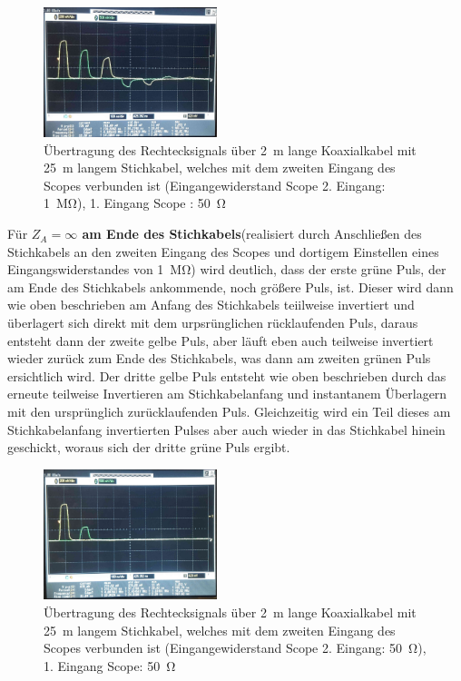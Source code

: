 \documentclass[a4paper,twoside,final]{article}
\begin{document}
\begin{figure}[htp]
    \centering
        \includegraphics[width=0.45\textwidth]{Bilder/Bild7.jpg}
    \caption{Übertragung des Rechtecksignals über \SI{2}{\meter} lange Koaxialkabel mit \SI{25}{\meter} langem Stichkabel, welches mit dem zweiten Eingang des Scopes verbunden ist (Eingangewiderstand Scope 2. Eingang: \SI{1}{\mega\ohm}), 1. Eingang Scope : \SI{50}{\ohm}}
\end{figure}

Für \textbf{$Z_A = \infty$ am Ende des Stichkabels}(realisiert durch Anschließen des Stichkabels an den zweiten Eingang des Scopes und dortigem Einstellen eines Eingangswiderstandes von \SI{1}{\mega\ohm}) wird deutlich, dass der erste grüne Puls, der am Ende des Stichkabels ankommende, noch größere Puls, ist. Dieser wird dann wie oben beschrieben am Anfang des Stichkabels teiilweise invertiert und überlagert sich direkt mit dem urpsrünglichen rücklaufenden Puls, daraus entsteht dann der zweite gelbe Puls, aber läuft eben auch teilweise invertiert wieder zurück zum Ende des Stichkabels, was dann am zweiten grünen Puls ersichtlich wird. Der dritte gelbe Puls entsteht wie oben beschrieben durch das erneute teilweise Invertieren am Stichkabelanfang und instantanem Überlagern mit den ursprünglich zurücklaufenden Puls. Gleichzeitig wird ein Teil dieses am Stichkabelanfang invertierten Pulses aber auch wieder in das Stichkabel hinein geschickt, woraus sich der dritte grüne Puls ergibt. \\

\begin{figure}[htp]
    \centering
        \includegraphics[width=0.45\textwidth]{Bilder/Bild8.jpg}
    \caption{Übertragung des Rechtecksignals über \SI{2}{\metre} lange Koaxialkabel mit \SI{25}{\metre} langem Stichkabel, welches mit dem zweiten Eingang des Scopes verbunden ist (Eingangewiderstand Scope 2. Eingang: \SI{50}{\ohm}), 1. Eingang Scope: \SI{50}{\ohm}}
\end{figure}
\end{document}
